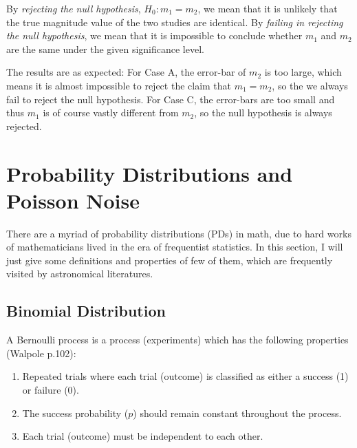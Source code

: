 By \textit{rejecting the null hypothesis}, $ H_0: m_1 = m_2 $, we mean that it is unlikely that the true magnitude value of the two studies are identical. By \textit{failing in rejecting the null hypothesis}, we mean that it is impossible to conclude whether $ m_1 $ and $ m_2 $ are the same under the given significance level. 

The results are as expected: For Case A, the error-bar of $ m_2 $ is too large, which means it is almost impossible to reject the claim that $ m_1 = m_2 $, so the we always fail to reject the null hypothesis. For Case C, the error-bars are too small and thus $ m_1 $ is of course vastly different from $ m_2 $, so the null hypothesis is always rejected.





\section{Probability Distributions and Poisson Noise}
There are a myriad of probability distributions (PDs) in math, due to hard works of mathematicians lived in the era of frequentist statistics. In this section, I will just give some definitions and properties of few of them, which are frequently visited by astronomical literatures.

\subsection{Binomial Distribution}
\begin{defn}
A Bernoulli process is a process (experiments) which has the following properties (Walpole p.102):
\begin{enumerate}
  \item Repeated trials where each trial (outcome) is classified as either a success (1) or failure (0).
  \item The success probability ($ p $) should remain constant throughout the process.
  \item Each trial (outcome) must be independent to each other.
\end{enumerate}
\end{defn}

